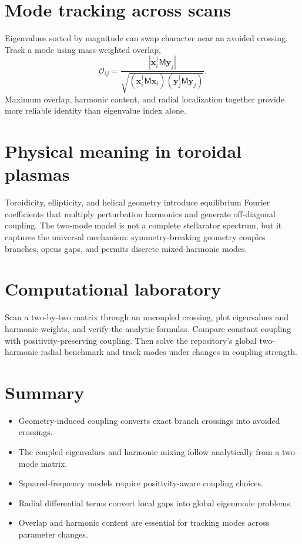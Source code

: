 \documentclass[11pt]{article}
\begin{document}
\section{Mode tracking across scans}

Eigenvalues sorted by magnitude can swap character near an avoided crossing. Track a mode using mass-weighted overlap,
\begin{equation}
\mathcal O_{ij}=
\frac{|\mathbf x_i^\dagger\mathsf M\mathbf y_j|}
{\sqrt{(\mathbf x_i^\dagger\mathsf M\mathbf x_i)
(\mathbf y_j^\dagger\mathsf M\mathbf y_j)}}.
\end{equation}
Maximum overlap, harmonic content, and radial localization together provide more reliable identity than eigenvalue index alone.


\section{Physical meaning in toroidal plasmas}

Toroidicity, ellipticity, and helical geometry introduce equilibrium Fourier coefficients that multiply perturbation harmonics and generate off-diagonal coupling. The two-mode model is not a complete stellarator spectrum, but it captures the universal mechanism: symmetry-breaking geometry couples branches, opens gaps, and permits discrete mixed-harmonic modes.


\section{Computational laboratory}
Scan a two-by-two matrix through an uncoupled crossing, plot eigenvalues and harmonic weights, and verify the analytic formulas. Compare constant coupling with positivity-preserving coupling. Then solve the repository's global two-harmonic radial benchmark and track modes under changes in coupling strength.

\section{Summary}
\begin{itemize}[leftmargin=1.6em]
\item Geometry-induced coupling converts exact branch crossings into avoided crossings.
\item The coupled eigenvalues and harmonic mixing follow analytically from a two-mode matrix.
\item Squared-frequency models require positivity-aware coupling choices.
\item Radial differential terms convert local gaps into global eigenmode problems.
\item Overlap and harmonic content are essential for tracking modes across parameter changes.
\end{itemize}
\end{document}
